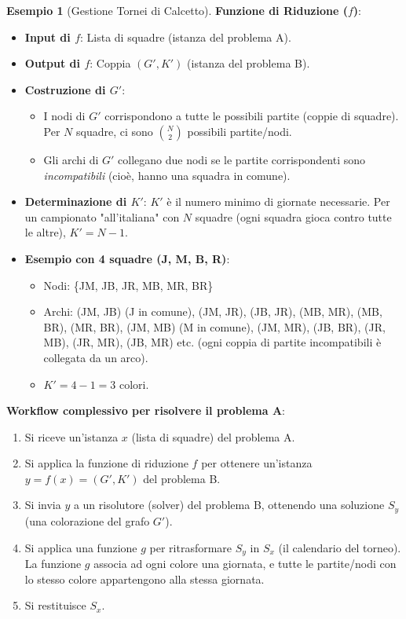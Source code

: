 \documentclass[a4paper]{article}
\theoremstyle{definition} %
\newtheorem{example}[theorem]{Esempio}
\begin{document}
\begin{example}[Gestione Tornei di Calcetto]
\textbf{Funzione di Riduzione ($f$)}:
\begin{itemize}
    \item \textbf{Input di $f$}: Lista di squadre (istanza del problema A).
    \item \textbf{Output di $f$}: Coppia $(G', K')$ (istanza del problema B).
    \item \textbf{Costruzione di $G'$}:
        \begin{itemize}
            \item I nodi di $G'$ corrispondono a tutte le possibili partite (coppie di squadre). Per $N$ squadre, ci sono $\binom{N}{2}$ possibili partite/nodi.
            \item Gli archi di $G'$ collegano due nodi se le partite corrispondenti sono \textit{incompatibili} (cioè, hanno una squadra in comune).
        \end{itemize}
    \item \textbf{Determinazione di $K'$}: $K'$ è il numero minimo di giornate necessarie. Per un campionato "all'italiana" con $N$ squadre (ogni squadra gioca contro tutte le altre), $K' = N-1$.
    \item \textbf{Esempio con 4 squadre (J, M, B, R)}:
        \begin{itemize}
            \item Nodi: \{JM, JB, JR, MB, MR, BR\}
            \item Archi: (JM, JB) (J in comune), (JM, JR), (JB, JR), (MB, MR), (MB, BR), (MR, BR), (JM, MB) (M in comune), (JM, MR), (JB, BR), (JR, MB), (JR, MR), (JB, MR) etc. (ogni coppia di partite incompatibili è collegata da un arco).
            \item $K' = 4-1 = 3$ colori.
        \end{itemize}
\end{itemize}

\textbf{Workflow complessivo per risolvere il problema A}:
\begin{enumerate}
    \item Si riceve un'istanza $x$ (lista di squadre) del problema A.
    \item Si applica la funzione di riduzione $f$ per ottenere un'istanza $y = f(x) = (G', K')$ del problema B.
    \item Si invia $y$ a un risolutore (solver) del problema B, ottenendo una soluzione $S_y$ (una colorazione del grafo $G'$).
    \item Si applica una funzione $g$ per ritrasformare $S_y$ in $S_x$ (il calendario del torneo). La funzione $g$ associa ad ogni colore una giornata, e tutte le partite/nodi con lo stesso colore appartengono alla stessa giornata.
    \item Si restituisce $S_x$.
\end{enumerate}


\end{example}
\end{document}
